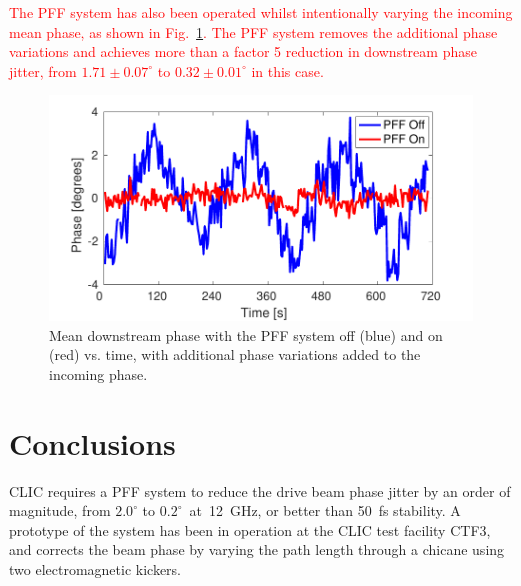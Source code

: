 \documentclass[%
 reprint,
superscriptaddress,
 amsmath,amssymb,
 prl,
]{revtex4-1}
\begin{document}
\textcolor{red}{The PFF system has also been operated 
whilst intentionally varying the incoming mean phase, as shown in 
Fig.~\ref{fig:wiggle}. The PFF system removes the additional phase variations 
and achieves more than a factor 5 reduction in downstream phase jitter, from 
\(1.71\pm0.07^\circ\) to \(0.32\pm0.01^\circ\) in this case.}

\begin{figure}
	\includegraphics[width=\columnwidth]{figs/wiggle}
	\caption{\label{fig:wiggle}Mean downstream phase with the PFF system off 
		(blue) and on (red) vs. time, with additional phase variations added to 
		the 
		incoming phase.}
\end{figure}

%
%
%

\section{\label{s:conc}Conclusions}

CLIC requires a PFF system to reduce the drive beam phase jitter by an order of 
magnitude, from \(2.0^\circ\) to \(0.2^\circ\)~at~12~GHz, or better than 50~fs 
stability. A prototype of the system has been 
in operation at the CLIC test facility CTF3, and corrects the beam phase by 
varying the path length through a chicane using two electromagnetic kickers. 
\end{document}
